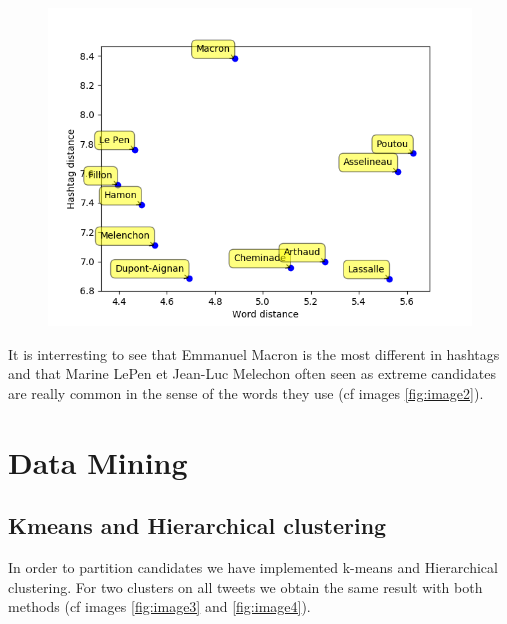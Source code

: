\documentclass[a4paper]{article}
\theoremstyle{definition}
\begin{document}
\begin{figure}
\includegraphics[width=\textwidth]{distances.png}
\end{figure}

It is interresting to see that Emmanuel Macron is the most different in hashtags and that Marine LePen et Jean-Luc Melechon often seen as extreme candidates are really common in the sense of the words they use (cf images \ref{fig:image2}).

\newpage
\section{Data Mining}
\subsection{Kmeans and Hierarchical clustering}
In order to partition candidates we have implemented k-means and Hierarchical clustering.
For two clusters on all tweets we obtain the same result with both methods (cf images \ref{fig:image3} and \ref{fig:image4}).
\end{document}

